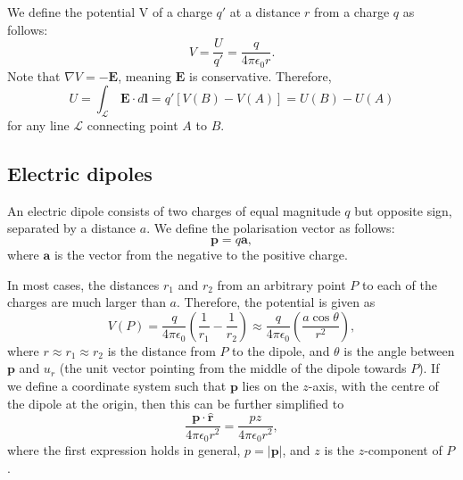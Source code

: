 \documentclass[a4paper, 12pt]{article}
\renewcommand{\vec}[1]{\bm{#1}}
\newcommand{\E}{\ensuremath{\vec{E}}}
\newcommand{\e}{\ensuremath{\epsilon_0}}
\let\tmp\hat
\renewcommand{\hat}[1]{\vec{\tmp{#1}}}
\begin{document}
    
    We define the potential V of a charge $q'$ at a distance $r$ from a charge $q$ as follows: 
    \begin{equation}
        V = \frac{U}{q'} = \frac{q}{4\pi\e r}.
    \end{equation}
    Note that $\nabla V = -\E$, meaning $\E$ is conservative. Therefore, 
    \begin{equation}
        U = \int_\mathcal{L}\,\E\cdot d\vec{l} = q'[V(B) - V(A)] = U(B) - U(A)
    \end{equation}
    for any line $\mathcal{L}$ connecting point $A$ to $B$.

\subsection{Electric dipoles}
    An electric dipole consists of two charges of equal magnitude $q$ but opposite sign, separated by a distance $a$. 
    We define the polarisation vector as follows: 
    \begin{equation}
        \vec{p} = q\vec{a},
    \end{equation}
    where $\vec{a}$ is the vector from the negative  to the positive charge. 
    
    In most cases, the distances $r_1$ and $r_2$ from an arbitrary point $P$ to each of the charges are much larger than $a$. 
    Therefore, the potential is given as 
    \begin{equation}
        V(P) = \frac{q}{4\pi\e}\left( \frac{1}{r_1}-\frac{1}{r_2}\right) \approx 
        \frac{q}{4\pi\e}\left(\frac{a\cos\theta}{r^2}\right),
    \end{equation}
    where $r \approx r_1 \approx r_2$ is the distance from $P$ to the dipole, and $\theta$ is the angle between $\vec{p}$ and $u_r$ 
    (the unit vector pointing from the middle of the dipole towards $P$). 
    If we define a coordinate system such that $\vec{p}$ lies on the $z$-axis, 
    with the centre of the dipole at the origin, then this can be further simplified to
    \begin{equation}
        \frac{\vec{p}\cdot \hat{r}}{4\pi\e r^2} = \frac{pz}{4\pi\e r^2},
    \end{equation}
    where the first expression holds in general, $p = |\vec{p}|$, and $z$ is the $z$-component of $P$.
    
\end{document}
